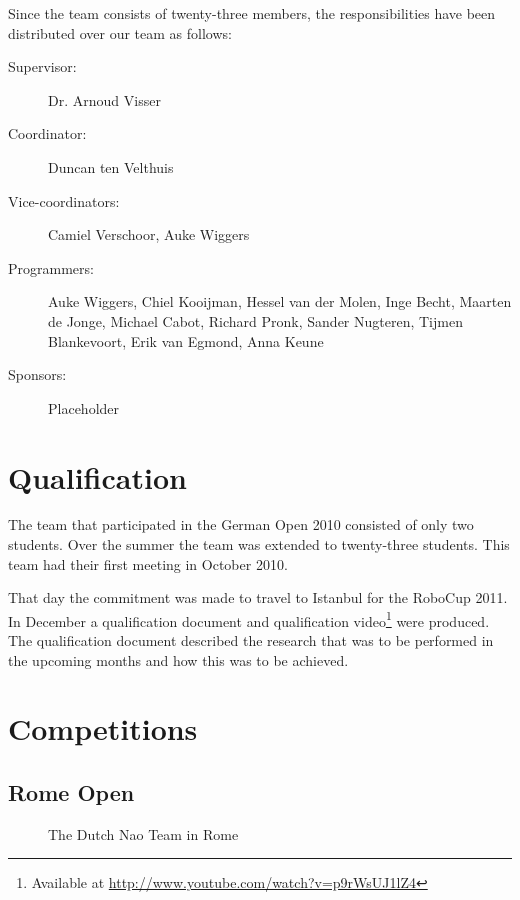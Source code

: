 \documentclass[11pt,a4paper,oneside]{article}
\begin{document}
Since the team consists of twenty-three members, the responsibilities have been distributed over our team as follows:
\begin{description}
\item[Supervisor:] Dr. Arnoud Visser %
\item[Coordinator:] Duncan ten Velthuis
\item[Vice-coordinators:] Camiel Verschoor, Auke Wiggers
\item[Programmers:] Auke Wiggers, Chiel Kooijman, Hessel van der Molen, Inge
    Becht, Maarten de Jonge, Michael Cabot, Richard Pronk, Sander Nugteren,
    Tijmen Blankevoort, Erik van Egmond, Anna Keune
\item[Sponsors:] Placeholder
\end{description}

\section{Qualification}
The team that participated in the German Open 2010 \cite{DutchNaoTeamTDP2010} consisted of only two students. Over the summer the team was extended to twenty-three students. This team had their first meeting in October 2010. 

That day the commitment was made to travel to Istanbul for the RoboCup 2011. In December a qualification document \cite{DutchNaoTeamQualification} and qualification video\footnote{Available at \url{http://www.youtube.com/watch?v=p9rWsUJ1lZ4}} were produced. The qualification document described the research that was to be performed in the upcoming months and how this was to be achieved.

\section{Competitions}

\subsection{Rome Open}

\begin{figure}[htb]    	
\centering
{}
\caption{The Dutch Nao Team in Rome}
\label{fig:TeamPhotoRome}
\end{figure}
\end{document}
